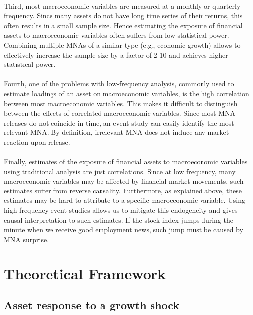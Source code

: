 \documentclass[12pt]{article}
\begin{document}
\paragraph{}
Third, most macroeconomic variables are measured at a monthly or quarterly frequency. Since many assets do not have long time series of their returns, this often results in a small sample size. Hence estimating the exposure of financial assets to macroeconomic variables often suffers from low statistical power. Combining multiple MNAs of a similar type (e.g., economic growth) allows to effectively increase the sample size by a factor of 2-10 and achieves higher statistical power. 
\paragraph{}
Fourth, one of the problems with low-frequency analysis, commonly used to estimate loadings of an asset on macroeconomic variables, is the high correlation between most macroeconomic variables. This makes it difficult to distinguish between the effects of correlated macroeconomic variables. Since most MNA releases do not coincide in time, an event study can easily identify the most relevant MNA. By definition, irrelevant MNA does not induce any market reaction upon release.
\paragraph{}
Finally, estimates of the exposure of financial assets to macroeconomic variables using traditional analysis are just correlations. Since at low frequency, many macroeconomic variables may be affected by financial market movements, such estimates suffer from reverse causality. Furthermore, as explained above, these estimates may be hard to attribute to a specific macroeconomic variable. Using high-frequency event studies allows us to mitigate this endogeneity and gives causal interpretation to such estimates. If the stock index jumps during the minute when we receive good employment news, such jump must be caused by MNA surprise.


\section{Theoretical Framework}

\subsection{Asset response to a growth shock}
\end{document}
